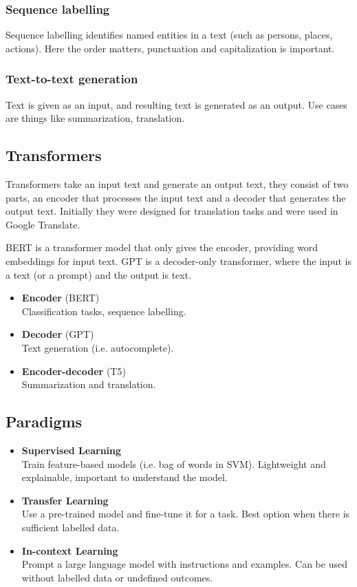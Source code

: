 \subsubsection{Sequence labelling}

Sequence labelling identifies named entities in a text (such as persons, places,
actions). Here the order matters, punctuation and capitalization is important.

\subsubsection{Text-to-text generation}

Text is given as an input, and resulting text is generated as an
output. Use cases
are things like summarization, translation.

\subsection{Transformers}

Transformers take an input text and generate an output text, they
consist of two parts,
an encoder that processes the input text and a decoder that generates
the output text.
Initially they were designed for translation tasks and were used in
Google Translate.

BERT is a transformer model that only gives the encoder, providing
word embeddings for
input text. GPT is a decoder-only transformer, where the input is a
text (or a prompt)
and the output is text.

\begin{itemize}
  \item \textbf{Encoder} (BERT) \\
    Classification tasks, sequence labelling.
  \item \textbf{Decoder} (GPT) \\
    Text generation (i.e. autocomplete).
  \item \textbf{Encoder-decoder} (T5) \\
    Summarization and translation.
\end{itemize}

\subsection{Paradigms}

\begin{itemize}
  \item \textbf{Supervised Learning} \\
    Train feature-based models (i.e. bag of words in SVM).
    Lightweight and explainable, important to understand the model.
  \item \textbf{Transfer Learning} \\
    Use a pre-trained model and fine-tune it for a task. Best option
    when there is sufficient labelled data.
  \item \textbf{In-context Learning} \\
    Prompt a large language model with instructions and examples. Can
    be used without labelled data or undefined outcomes.
\end{itemize}

